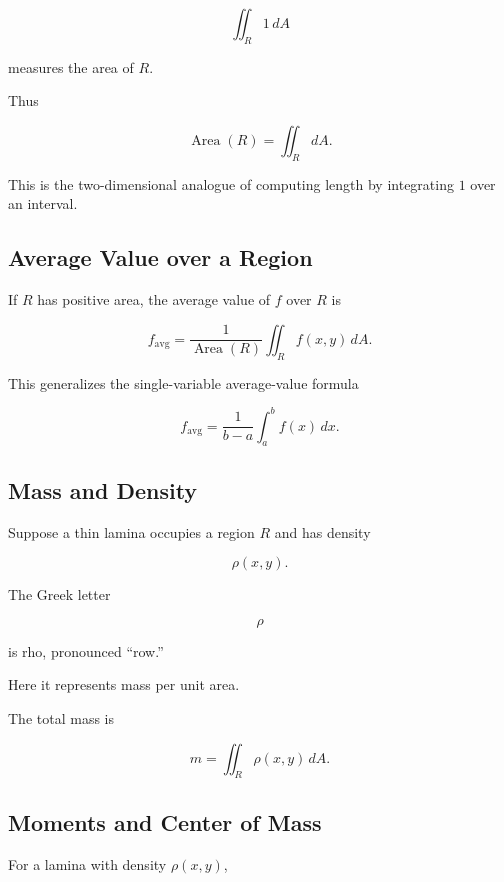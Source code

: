 \[ \iint_R1\,dA \]

measures the area of \(R\).

Thus

\[ \boxed{\operatorname{Area}(R)=\iint_R dA.} \]

This is the two-dimensional analogue of computing length by integrating
\(1\) over an interval.

\subsection{Average Value over a Region}
\label{subsec:average-value-region}

If \(R\) has positive area, the average value of \(f\) over \(R\) is

\[ f_{\mathrm{avg}}
=
\frac{1}{\operatorname{Area}(R)}
\iint_R f(x,y)\,dA. \]

This generalizes the single-variable average-value formula

\[ f_{\mathrm{avg}}
=
\frac1{b-a}\int_a^b f(x)\,dx. \]

\subsection{Mass and Density}
\label{subsec:mass-density-double-integral}

Suppose a thin lamina occupies a region \(R\) and has density

\[ \rho(x,y). \]

The Greek letter

\[ \rho \]

is rho, pronounced ``row.''

Here it represents mass per unit area.

The total mass is

\[ \boxed{m=\iint_R\rho(x,y)\,dA.} \]

\subsection{Moments and Center of Mass}
\label{subsec:center-mass-double}

For a lamina with density \(\rho(x,y)\),

